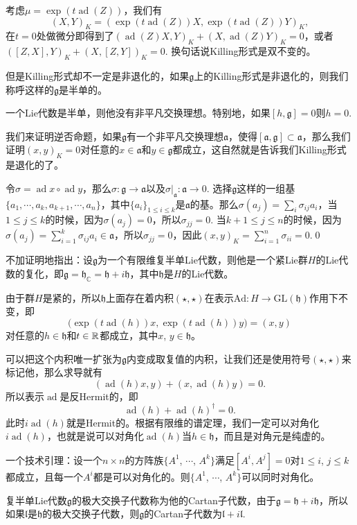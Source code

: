 \documentclass[10pt]{article}
\newcommand{\cc}{\mathbb{C}}
\newcommand{\lag}{{\mathfrak{g}}}
\DeclareMathOperator{\ad}{ad}
\begin{document}
考虑$\mu=\exp(t\ad(Z))$，我们有
\[
	(X,Y)_K=(\exp(t\ad(Z))X,\exp(t\ad(Z))Y)_K,
\]
在$t=0$处做微分即得到了$(\ad(Z)X,Y)_K+(X,\ad(Z)Y)_K=0$，或者$([Z,X],Y)_K+(X,[Z,Y])_K=0$. 换句话说Killing形式是双不变的。

但是Killing形式却不一定是非退化的，如果$\lag$上的Killing形式是非退化的，则我们称呼这样的$\lag$是半单的。

\pro 一个Lie代数是半单，则他没有非平凡交换理想。特别地，如果$[h,\lag]=0$则$h=0$.

\proof 我们来证明逆否命题，如果$\lag$有一个非平凡交换理想$\mathfrak{a}$，使得$[\mathfrak{a},\lag]\subset \mathfrak{a}$，那么我们证明$(x,y)_K=0$对任意的$x\in \mathfrak{a}$和$y\in \lag$都成立，这自然就是告诉我们Killing形式是退化的了。

令$\sigma=\ad x\circ \ad y$，那么$\sigma:\lag\to \mathfrak{a}$以及$\sigma|_\mathfrak{a}:\mathfrak{a}\to 0$. 选择$\lag$这样的一组基$\{a_1,\cdots,a_k,a_{k+1},\cdots,a_{n}\}$，其中$\{a_i\}_{1\leq i \leq k}$是$\mathfrak{a}$的基。那么$\sigma(a_j)=\sum_i\sigma_{ij} a_i$，当$1\leq j\leq k$的时候，因为$\sigma(a_j)=0$，所以$\sigma_{jj}=0$. 当$k+1\leq j \leq n$的时候，因为$\sigma(a_j)=\sum_{i=1}^k\sigma_{ij} a_i\in\mathfrak{a}$，所以$\sigma_{jj}=0$，因此$(x,y)_K=\sum_{i=1}^n\sigma_{ii}=0$.\qed

\theo 不加证明地指出：设$\lag$为一个有限维复半单Lie代数，则他是一个紧Lie群$H$的Lie代数的复化，即$\lag=\mathfrak{h}_{\cc}=\mathfrak{h}+i\mathfrak{h}$，其中$\mathfrak{h}$是$H$的Lie代数。

由于群$H$是紧的，所以$\mathfrak{h}$上面存在着内积$(\star,\star)$在表示$\mathrm{Ad}:H\to \mathrm{GL}(\mathfrak{h})$作用下不变，即
\[
	\bigl(\exp(t\ad(h))x,\exp(t\ad(h))y\bigr)=(x,y)
\]
对任意的$h\in\mathfrak{h}$和$t\in \mathbb{R}$都成立，其中$x$, $y\in\mathfrak{h}$。

可以把这个内积唯一扩张为$\lag$内变成取复值的内积，让我们还是使用符号$(\star,\star)$来标记他，那么求导就有
\[
	(\ad(h)x,y)+(x,\ad(h)y)=0.
\]
所以表示$\ad$是反Hermit的，即
\[
	\ad(h)+\ad(h)^\dag=0.
\]
此时$i\ad(h)$就是Hermit的。根据有限维的谱定理，我们一定可以对角化$i\ad(h)$，也就是说可以对角化$\ad(h)$当$h\in \mathfrak{h}$，而且是对角元是纯虚的。

\lem 一个技术引理：设一个$n\times n$的方阵族$\{A^1$, $\cdots$, $A^k\}$满足$[A^i,A^j]=0$对$1\leq i$, $j\leq k$都成立，且每一个$A^i$都是可以对角化的。则$\{A^1$, $\cdots$, $A^k\}$可以同时对角化。

\para 复半单Lie代数$\lag$的极大交换子代数称为他的Cartan子代数，由于$\lag=\mathfrak{h}+i\mathfrak{h}$，所以如果$\mathfrak{l}$是$\mathfrak{h}$的极大交换子代数，则$\lag$的Cartan子代数为$\mathfrak{l}+i\mathfrak{l}$.
\end{document}
